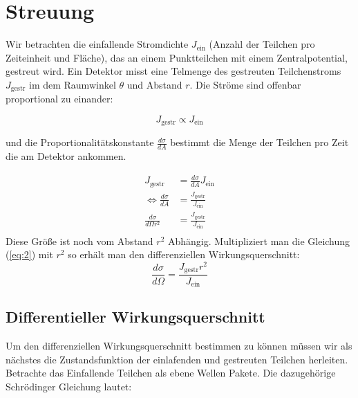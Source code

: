 


\usepackage{amsmath} 





\section*{Streuung}


Wir betrachten die einfallende Stromdichte \(J_{\text{ein}}\) (Anzahl der Teilchen pro Zeiteinheit und Fläche), das an einem Punktteilchen mit einem Zentralpotential, gestreut wird. Ein Detektor misst eine Telmenge des gestreuten Teilchenstroms \(J_{\text{gestr}}\) im dem Raumwinkel \(\theta\) und Abstand \(r\). Die Ströme sind offenbar proportional zu einander:


\begin{equation}
  \label{eq:1}
  J_{\text{gestr}} \propto J_{\text{ein}}
\end{equation}


und die Proportionalitätskonstante \(\frac{d\sigma}{dA}\) bestimmt die Menge der Teilchen pro Zeit die am Detektor ankommen. 

\begin{align}
  \label{eq:2}
  J_{\text{gestr}} &= \frac{d\sigma}{dA} J_{\text{ein}}\\
\Leftrightarrow \frac{d\sigma}{dA} &= \frac{ J_{\text{gestr}} }{J_{\text{ein}}} \\
\frac{d\sigma}{d\Omega r^2} &= \frac{ J_{\text{gestr}} }{J_{\text{ein}}} \\
\end{align}
Diese Größe ist noch vom Abstand \(r^2\) Abhängig. Multipliziert man die Gleichung (\ref{eq:2}) mit \(r^2\) so erhält man den differenziellen Wirkungsquerschnitt:
\begin{equation}
  \label{eq:3}
  \boxed{ \frac{d\sigma}{d\Omega} = \frac{ J_{\text{gestr}}r^2 }{J_{\text{ein}}} }
\end{equation}


\subsection{Differentieller Wirkungsquerschnitt}

Um den differenziellen Wirkungsquerschnitt bestimmen zu können müssen wir als nächstes die Zustandsfunktion der einlafenden und  gestreuten Teilchen herleiten. Betrachte das Einfallende Teilchen als ebene Wellen Pakete. Die dazugehörige Schrödinger Gleichung lautet:

